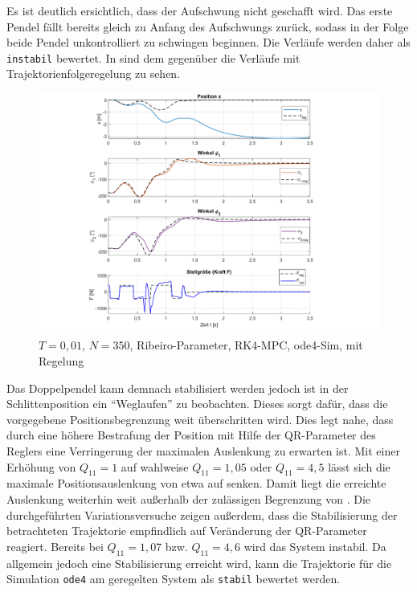 Es ist deutlich ersichtlich, dass der Aufschwung nicht geschafft wird. Das erste Pendel fällt bereits gleich zu Anfang des Aufschwungs zurück, sodass in der Folge beide Pendel unkontrolliert zu schwingen beginnen. Die Verläufe werden daher als \texttt{instabil} bewertet.
In  sind dem gegenüber die Verläufe mit Trajektorienfolgeregelung zu sehen. 
\begin{figure}[h]
	\centering
		\includegraphics[scale=\scaleyplots]{Bilder/Trajektorien/F400T0.01_rib_rk4_ode4_TFR_QR-alt.pdf}
	\caption{$T=0,01$, $N=350$, Ribeiro-Parameter, RK4-MPC, ode4-Sim, mit Regelung}
	\label{fig:F400T0.01_rib_rk4_ode4_TFR_QR-alt}
\end{figure}

Das Doppelpendel kann demnach stabilisiert werden jedoch ist in der Schlittenposition ein "`Weglaufen"' zu beobachten. Dieses sorgt dafür, dass die vorgegebene Positionsbegrenzung weit überschritten wird. Dies legt nahe, dass durch eine höhere Bestrafung der Position mit Hilfe der QR-Parameter des Reglers eine Verringerung der maximalen Auslenkung zu erwarten ist. Mit einer Erhöhung von $Q_{11}=1$ auf wahlweise $Q_{11}=1,05$ oder $Q_{11}=4,5$ lässt sich die maximale Positionsauslenkung von etwa  auf  senken. Damit liegt die erreichte Auslenkung weiterhin weit außerhalb der zulässigen Begrenzung von . Die durchgeführten Variationsversuche zeigen außerdem, dass die Stabilisierung der betrachteten Trajektorie empfindlich auf Veränderung der QR-Parameter reagiert. Bereits bei $Q_{11}=1,07$ bzw. $Q_{11}=4,6$ wird das System instabil. Da allgemein jedoch eine Stabilisierung erreicht wird, kann die Trajektorie für die Simulation \texttt{ode4} am geregelten System als \texttt{stabil} bewertet werden. 

